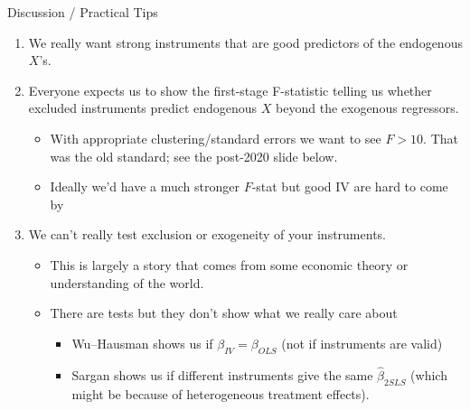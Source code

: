 \documentclass[aspectratio=169,11pt]{beamer}
\begin{document}
\begin{frame}{Discussion / Practical Tips}
\begin{enumerate}
	\item We really want \alert{strong instruments} that are good predictors of the \alert{endogenous} $X$'s.
	\item Everyone expects us to show the \alert{first-stage F-statistic} telling us whether \alert{excluded instruments} predict endogenous $X$ \alert{beyond the exogenous regressors}.
	\begin{itemize}
		\item With appropriate clustering/standard errors we want to see $F>10$. That was the old standard; see the post-2020 slide below.
		\item Ideally we'd have a much stronger $F$-stat but good IV are hard to come by
	\end{itemize}
	\item We can't really test \alert{exclusion} or \alert{exogeneity} of your instruments. 
	\begin{itemize}
		\item This is largely a story that comes from some economic theory or understanding of the world. 
	\item There are tests but they don't show what we really care about
	\begin{itemize}
		\item Wu--Hausman shows us if $\beta_{IV} = \beta_{OLS}$ (not if instruments are valid)
		\item Sargan shows us if different instruments give the same $\widehat{\beta}_{2SLS}$ (which might be because of \alert{heterogeneous treatment effects}).
	\end{itemize}
	\end{itemize}
\end{enumerate}
\end{frame}
\end{document}
